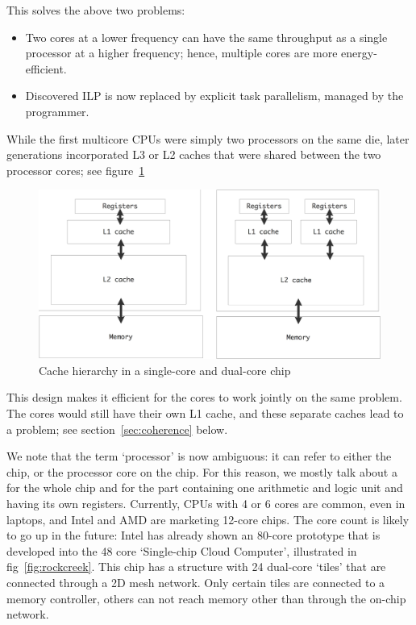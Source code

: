 This solves the above two problems:
\begin{itemize}
\item Two cores at a lower frequency can have the same throughput as a
  single processor at a higher frequency; hence, multiple cores are
  more energy-efficient.
\item Discovered \ac{ILP} is now replaced by explicit task
  parallelism, managed by the programmer.
\end{itemize}

While the first multicore \acp{CPU}
were simply two processors on the same die, later generations
incorporated L3 or L2 caches that were shared between the two
processor cores; see figure~\ref{fig:core-caches}
\begin{figure}[ht]
  \includegraphics[scale=.18]{graphics/cache-hierarchy}
  \caption{Cache hierarchy in a single-core and dual-core chip}
  \label{fig:core-caches}
\end{figure}
This design makes it efficient for the cores to work
jointly on the same problem. 
The cores would still have their own L1 cache, and these separate
caches lead to a  problem; see
section~\ref{sec:coherence} below.

We note that the term `processor' is now ambiguous: it can refer to either the
chip, or the processor core on the chip. For this reason, we mostly
talk about a  for the whole chip and
for the part containing one arithmetic and logic unit and
having its own registers. Currently, \acp{CPU} with 4 or 6 cores are
common,
even in laptops, and Intel and AMD are marketing 12-core chips.
The core count is
likely to go up in the future: Intel
has already shown an 80-core prototype that is developed into the 48
core `Single-chip Cloud Computer', illustrated in
fig~\ref{fig:rockcreek}. This chip has a structure with 24 dual-core
`tiles' that are connected through a 2D mesh network. Only certain
tiles are connected to a memory controller, others can not reach
memory other than through the on-chip network.

